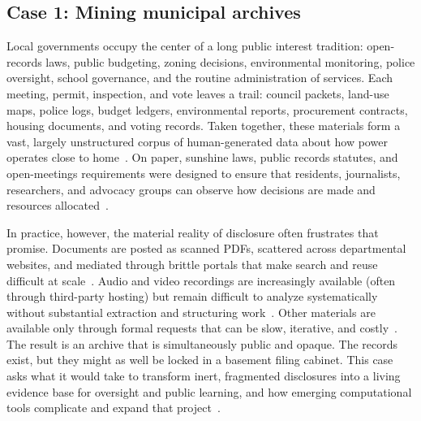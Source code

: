 \documentclass[acmsmall,screen]{acmart}
\begin{document}
\subsection*{Case 1: Mining municipal archives}

Local governments occupy the center of a long public interest tradition: open-records laws, public budgeting, zoning decisions, environmental monitoring, police oversight, school governance, and the routine administration of services. Each meeting, permit, inspection, and vote leaves a trail: council packets, land-use maps, police logs, budget ledgers, environmental reports, procurement contracts, housing documents, and voting records. Taken together, these materials form a vast, largely unstructured corpus of human-generated data about how power operates close to home~\cite{barariLocalViewDatabasePublic2023,sumnerCrowdsourcingReliableLocal2020}. On paper, sunshine laws, public records statutes, and open-meetings requirements were designed to ensure that residents, journalists, researchers, and advocacy groups can observe how decisions are made and resources allocated~\cite{einsteinWhoParticipatesLocal2019,yoderDoesPropertyOwnership2020,holmanTablingDebateHow2025}.

In practice, however, the material reality of disclosure often frustrates that promise. Documents are posted as scanned PDFs, scattered across departmental websites, and mediated through brittle portals that make search and reuse difficult at scale~\cite{brownCouncilDataProject2021,barariLocalViewDatabasePublic2023,fuNaturalLanguageProcessing2024}. Audio and video recordings are increasingly available (often through third-party hosting) but remain difficult to analyze systematically without substantial extraction and structuring work~\cite{barariPromiseTextAudio2025a,xuPUBLICSPEAKHearingPublic2025}. Other materials are available only through formal requests that can be slow, iterative, and costly~\cite{warrenRequestAtlasSupportingSlow2025}. The result is an archive that is simultaneously public and opaque. The records exist, but they might as well be locked in a basement filing cabinet. This case asks what it would take to transform inert, fragmented disclosures into a living evidence base for oversight and public learning, and how emerging computational tools complicate and expand that project~\cite{spangherTrackingNewsworthinessPublic2024,fuNaturalLanguageProcessing2024}.
\end{document}
